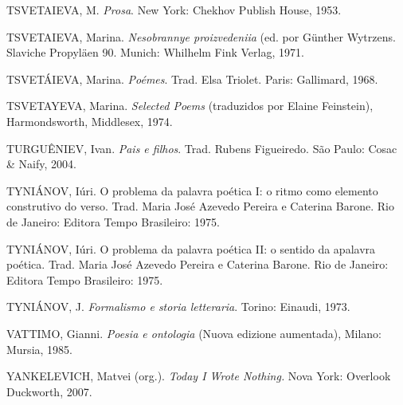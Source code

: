 TSVETAIEVA, M. \emph{Prosa}. New York: Chekhov Publish House, 1953.

TSVETAIEVA, Marina. \emph{Nesobrannye proizvedeniia} (ed. por Günther
Wytrzens. Slaviche Propyläen 90. Munich: Whilhelm Fink Verlag, 1971.

TSVETÁIEVA, Marina. \emph{Poémes}. Trad. Elsa Triolet. Paris: Gallimard,
1968.

TSVETAYEVA, Marina. \emph{Selected Poems} (traduzidos por Elaine
Feinstein), Harmondsworth, Middlesex, 1974.

TURGUÊNIEV, Ivan. \emph{Pais e filhos}. Trad. Rubens Figueiredo. São
Paulo: Cosac \& Naify, 2004.

TYNIÁNOV, Iúri. O problema da palavra poética I: o ritmo como elemento
construtivo do verso. Trad. Maria José Azevedo Pereira e Caterina
Barone. Rio de Janeiro: Editora Tempo Brasileiro: 1975.

TYNIÁNOV, Iúri. O problema da palavra poética II: o sentido da apalavra
poética. Trad. Maria José Azevedo Pereira e Caterina Barone. Rio de
Janeiro: Editora Tempo Brasileiro: 1975.

TYNIÁNOV, J. \emph{Formalismo e storia letteraria}. Torino: Einaudi,
1973.

VATTIMO, Gianni. \emph{Poesia e ontologia} (Nuova edizione aumentada),
Milano: Mursia, 1985.

YANKELEVICH, Matvei (org.). \emph{Today I Wrote Nothing.} Nova York:
Overlook Duckworth, 2007.
